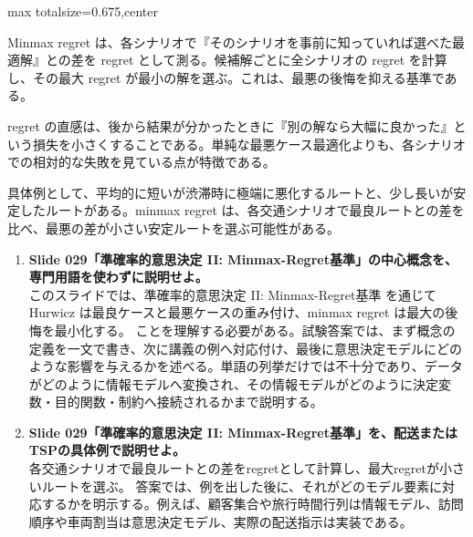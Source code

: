 \begin{adjustbox}{max totalsize={\textwidth}{0.675\textheight},center}
\begin{minipage}{\textwidth}
\begin{minipage}[t]{0.485\textwidth}
Minmax regret は、各シナリオで『そのシナリオを事前に知っていれば選べた最適解』との差を regret として測る。候補解ごとに全シナリオの regret を計算し、その最大 regret が最小の解を選ぶ。これは、最悪の後悔を抑える基準である。\par
regret の直感は、後から結果が分かったときに『別の解なら大幅に良かった』という損失を小さくすることである。単純な最悪ケース最適化よりも、各シナリオでの相対的な失敗を見ている点が特徴である。\par
具体例として、平均的に短いが渋滞時に極端に悪化するルートと、少し長いが安定したルートがある。minmax regret は、各交通シナリオで最良ルートとの差を比べ、最悪の差が小さい安定ルートを選ぶ可能性がある。\par
{}
\begin{enumerate}
\item \textbf{Slide 029「準確率的意思決定 II: Minmax-Regret基準」の中心概念を、専門用語を使わずに説明せよ。}\\このスライドでは、準確率的意思決定 II: Minmax-Regret基準 を通じて Hurwicz は最良ケースと最悪ケースの重み付け、minmax regret は最大の後悔を最小化する。 ことを理解する必要がある。試験答案では、まず概念の定義を一文で書き、次に講義の例へ対応付け、最後に意思決定モデルにどのような影響を与えるかを述べる。単語の列挙だけでは不十分であり、データがどのように情報モデルへ変換され、その情報モデルがどのように決定変数・目的関数・制約へ接続されるかまで説明する。
\item \textbf{Slide 029「準確率的意思決定 II: Minmax-Regret基準」を、配送またはTSPの具体例で説明せよ。}\\各交通シナリオで最良ルートとの差をregretとして計算し、最大regretが小さいルートを選ぶ。 答案では、例を出した後に、それがどのモデル要素に対応するかを明示する。例えば、顧客集合や旅行時間行列は情報モデル、訪問順序や車両割当は意思決定モデル、実際の配送指示は実装である。
\end{enumerate}
\end{minipage}
\end{minipage}
\end{adjustbox}

